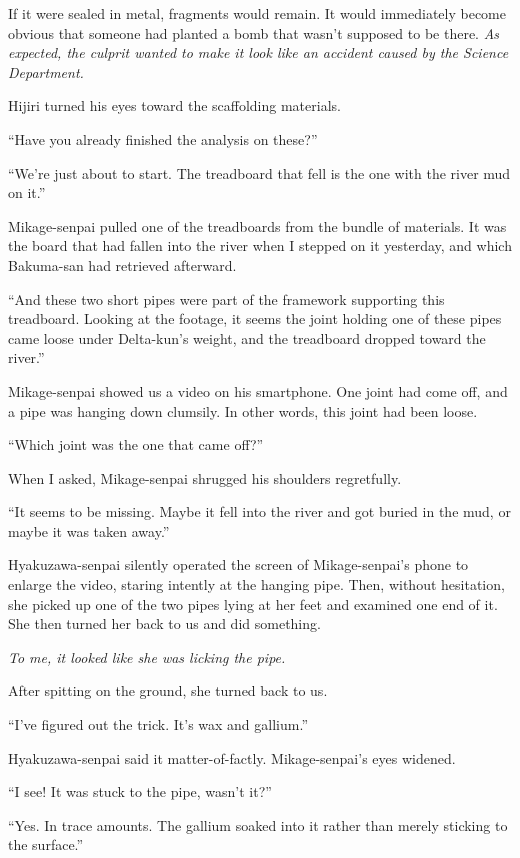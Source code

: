 \documentclass[
    a4paper,
    12pt,
    twoside,
    openany,
    UTF8,
    fontset=windows
]{ctexbook}
\begin{document}
If it were sealed in metal, fragments would remain. It would immediately become obvious that someone had planted a bomb that wasn't supposed to be there. \textit{As expected, the culprit wanted to make it look like an accident caused by the Science Department.}

Hijiri turned his eyes toward the scaffolding materials.

``Have you already finished the analysis on these?''

``We're just about to start. The treadboard that fell is the one with the river mud on it.''

Mikage-senpai pulled one of the treadboards from the bundle of materials. It was the board that had fallen into the river when I stepped on it yesterday, and which Bakuma-san had retrieved afterward.

``And these two short pipes were part of the framework supporting this treadboard. Looking at the footage, it seems the joint holding one of these pipes came loose under Delta-kun's weight, and the treadboard dropped toward the river.''

Mikage-senpai showed us a video on his smartphone. One joint had come off, and a pipe was hanging down clumsily. In other words, this joint had been loose.

``Which joint was the one that came off?''

When I asked, Mikage-senpai shrugged his shoulders regretfully.

``It seems to be missing. Maybe it fell into the river and got buried in the mud, or maybe it was taken away.''

Hyakuzawa-senpai silently operated the screen of Mikage-senpai's phone to enlarge the video, staring intently at the hanging pipe. Then, without hesitation, she picked up one of the two pipes lying at her feet and examined one end of it. She then turned her back to us and did something.

\textit{To me, it looked like she was licking the pipe.}

After spitting on the ground, she turned back to us.

``I've figured out the trick. It's wax and gallium.''

Hyakuzawa-senpai said it matter-of-factly. Mikage-senpai's eyes widened.

``I see! It was stuck to the pipe, wasn't it?''

``Yes. In trace amounts. The gallium soaked into it rather than merely sticking to the surface.''
\end{document}

